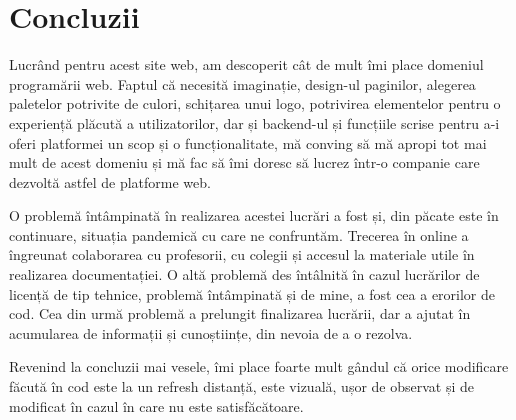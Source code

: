 \documentclass[12pt,a4paper]{report}
\begin{document}
\section{Concluzii}
\par
Lucrând pentru acest site web, am descoperit cât de mult îmi place domeniul programării web. Faptul că necesită imaginație, design-ul paginilor, alegerea paletelor potrivite de culori, schițarea unui logo, potrivirea elementelor pentru o experiență plăcută a utilizatorilor, dar și backend-ul și funcțiile scrise pentru a-i oferi platformei un scop și o funcționalitate, mă conving să mă apropi tot mai mult de acest domeniu și mă fac să îmi doresc să lucrez într-o companie care dezvoltă astfel de platforme web. 
\\ \par
O problemă întâmpinată în realizarea acestei lucrări a fost și, din păcate este în continuare, situația pandemică cu care ne confruntăm. Trecerea în online a îngreunat colaborarea cu profesorii, cu colegii și accesul la materiale utile în realizarea documentației. O altă problemă des întâlnită în cazul lucrărilor de licență de tip tehnice, problemă întâmpinată și de mine, a fost cea a erorilor de cod. Cea din urmă problemă a prelungit finalizarea lucrării, dar a ajutat în acumularea de informații și cunoștiințe, din nevoia de a o rezolva.
\\ \par
Revenind la concluzii mai vesele, îmi place foarte mult gândul că orice modificare făcută în cod este la un refresh distanță, este vizuală, ușor de observat și de modificat în cazul în care nu este satisfăcătoare.
\end{document}
